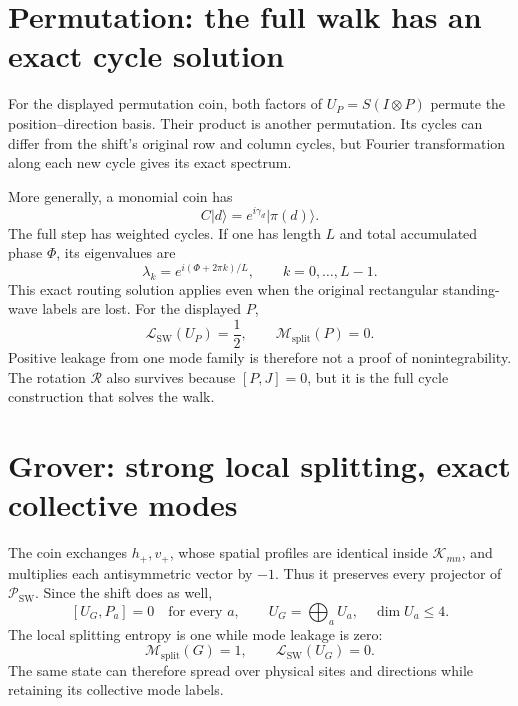 \documentclass[11pt,a4paper,oneside]{report}
\newcommand{\ket}[1]{\lvert #1\rangle}
\newcommand{\Id}{I}
\newcommand{\sw}{\mathrm{SW}}
\numberwithin{equation}{chapter}
\begin{document}
\section{Permutation: the full walk has an exact cycle solution}

For the displayed permutation coin, both factors of
\(U_P=S(\Id\otimes P)\) permute the position--direction basis.
Their product is another permutation. Its cycles can differ from the
shift's original row and column cycles, but Fourier transformation
along each new cycle gives its exact spectrum.

More generally, a monomial coin has
\begin{equation}
C\ket d=e^{i\gamma_d}\ket{\pi(d)}.
\end{equation}
The full step has weighted cycles. If one has length \(L\) and total
accumulated phase \(\Phi\), its eigenvalues are
\begin{equation}
\boxed{\lambda_k=e^{i(\Phi+2\pi k)/L},\qquad k=0,\ldots,L-1.}
\end{equation}
This exact routing solution applies even when the original rectangular
standing-wave labels are lost. For the displayed \(P\),
\begin{equation}
\mathcal L_{\sw}(U_P)=\frac12,\qquad
\mathcal M_{\mathrm{split}}(P)=0.
\end{equation}
Positive leakage from one mode family is therefore not a proof of
nonintegrability. The rotation \(\mathcal R\) also survives because
\([P,J]=0\), but it is the full cycle construction that solves the walk.

\section{Grover: strong local splitting, exact collective modes}
\label{sec:groverfull}

The coin exchanges \(h_+,v_+\), whose spatial profiles are identical
inside \(\mathcal K_{mn}\), and multiplies each antisymmetric vector
by \(-1\). Thus it preserves every projector of
\(\mathscr P_{\sw}\). Since the shift does as well,
\begin{equation}
\boxed{[U_G,P_a]=0\quad\text{for every }a,\qquad
U_G=\bigoplus_a U_a,\quad\dim U_a\leq4.}
\end{equation}
The local splitting entropy is one while mode leakage is zero:
\begin{equation}
\mathcal M_{\mathrm{split}}(G)=1,\qquad\mathcal L_{\sw}(U_G)=0.
\end{equation}
The same state can therefore spread over physical sites and directions
while retaining its collective mode labels.
\end{document}
